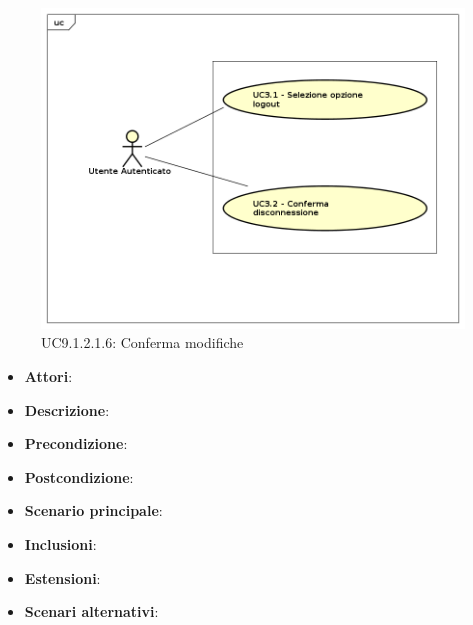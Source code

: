 					\label{UC9.1.2.1.6}
					\begin{figure}[h]
						\centering
					\includegraphics[scale=0.7,keepaspectratio]{UML/UC9.png}
						\caption{UC9.1.2.1.6: Conferma modifiche}
					\end{figure}
					\FloatBarrier
					\begin{itemize}
						\item \textbf{Attori}: 
						\item \textbf{Descrizione}: 
						\item \textbf{Precondizione}: 
						\item \textbf{Postcondizione}: 
						\item \textbf{Scenario principale}:
						\item \textbf{Inclusioni}:
						\item \textbf{Estensioni}:
						\item \textbf{Scenari alternativi}:
					\end{itemize}
					
